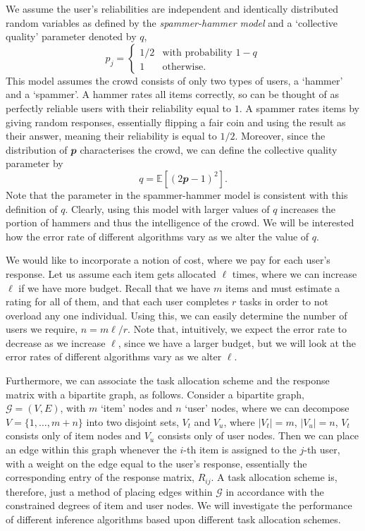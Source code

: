 \documentclass[12pt]{article}
\numberwithin{equation}{section}
\newcommand*\vecvar[1]{\mathbfit#1}
\newcommand*\graphvar[1]{\mathcal#1}
\newcommand*\abs[1]{\left\vert#1\right\vert}
\begin{document}
We assume the user's reliabilities are independent and identically distributed random variables as defined by the \textit{spammer-hammer model} and a `collective quality' parameter denoted by $q$,
\begin{equation}
	p_{j} =
	\begin{cases}
		1/2 & \text{with probability } 1-q\\
		1 & \text{otherwise}.
	\end{cases}
\end{equation}
This model assumes the crowd consists of only two types of users, a `hammer' and a `spammer'. A hammer rates all items correctly, so can be thought of as perfectly reliable users with their reliability equal to $1$. A spammer rates items by giving random responses, essentially flipping a fair coin and using the result as their answer, meaning their reliability is equal to $1/2$.  Moreover, since the distribution of $\vecvar{p}$ characterises the crowd, we can define the collective quality parameter by
\begin{equation}
	q = \mathbb{E}[(2\vecvar{p}-1)^{2}].
\end{equation}
Note that the parameter in the spammer-hammer model is consistent with this definition of $q$.
Clearly, using this model with larger values of $q$ increases the portion of hammers and thus the intelligence of the crowd. We will be interested how the error rate of different algorithms vary as we alter the value of $q$.

We would like to incorporate a notion of cost, where we pay for each user's response. Let us assume each item gets allocated $\ell$ times, where we can increase $\ell$ if we have more budget. Recall that we have $m$ items and must estimate a rating for all of them, and that each user completes $r$ tasks in order to not overload any one individual. Using this, we can easily determine the number of users we require, $n = m\ell/r$. Note that, intuitively, we expect the error rate to decrease as we increase $\ell$, since we have a larger budget, but we will look at the error rates of different algorithms vary as we alter $\ell$.

Furthermore, we can associate the task allocation scheme and the response matrix with a bipartite graph, as follows. Consider a bipartite graph, $\graphvar{G} = (V,E)$, with $m$ `item' nodes and $n$ `user' nodes, where we can decompose $V=\{1,\dots,m+n\}$ into two disjoint sets, $V_{t}$ and $V_{u}$, where $\abs{V_{t}} = m$, $\abs{V_{u}} = n$, $V_{t}$ consists only of item nodes and $V_{u}$ consists only of user nodes. Then we can place an edge within this graph whenever the $i$-th item is assigned to the $j$-th user, with a weight on the edge equal to the user's response, essentially the corresponding entry of the response matrix, $R_{ij}$. A task allocation scheme is, therefore, just a method of placing edges within $\graphvar{G}$ in accordance with the constrained degrees of item and user nodes. We will investigate the performance of different inference algorithms based upon different task allocation schemes.
\end{document}
